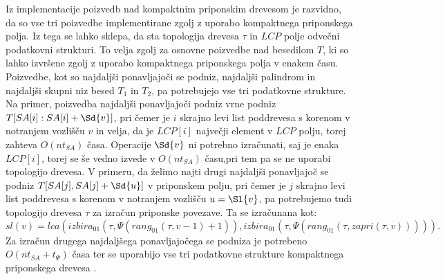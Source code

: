 Iz implementacije poizvedb nad kompaktnim priponskim drevesom je razvidno, da so vse tri poizvedbe implementirane zgolj z uporabo kompaktnega priponskega polja. Iz tega se lahko sklepa, da sta topologija drevesa $\tau$ in $LCP$ polje odvečni podatkovni strukturi. To velja zgolj za osnovne poizvedbe nad besedilom $T$, ki so lahko izvršene zgolj z uporabo kompaktnega priponskega polja v enakem času. Poizvedbe, kot so najdaljši ponavljajoči se podniz, najdaljši palindrom in najdaljši skupni niz besed $T_1$ in $T_2$, pa potrebujejo vse tri podatkovne strukture. Na primer, poizvedba najdaljši ponavljajoči podniz vrne podniz $T[SA[i]:SA[i]+\Sd{v}]$, pri čemer je $i$ skrajno levi list poddrevesa s korenom v notranjem vozlišču $v$ in velja, da je $LCP[i]$ največji element v $LCP$ polju, torej zahteva $O(nt_{SA})$ časa. Operacije $\Sd{v}$ ni potrebno izračunati, saj je enaka $LCP[i]$, torej se še vedno izvede v $O(nt_{SA})$ času,pri tem pa se ne uporabi topologijo drevesa. V primeru, da želimo najti drugi najdaljši ponavljajoč se podniz $T[SA[j],SA[j]+\Sd{u}]$ v priponskem polju, pri čemer je $j$ skrajno levi list poddrevesa s korenom v notranjem vozlišču $u=\Sl{v}$, pa potrebujemo tudi topologijo drevesa $\tau$ za izračun priponske povezave. Ta se izračunana kot:
$$
    sl(v)=lca(izbira_{01}(\tau,\Psi(rang_{01}(\tau,v-1)+1)),izbira_{01}(\tau,\Psi(rang_{01}(\tau,zapri(\tau,v))))).
$$
Za izračun drugega najdaljšega ponavljajočega se podniza je potrebeno $O(nt_{SA}+t_\Psi)$ časa ter se uporabijo vse tri podatkovne strukture kompaktnega priponskega drevesa \cite{Valimaki2007, Weiner1973, Navarro2016}.